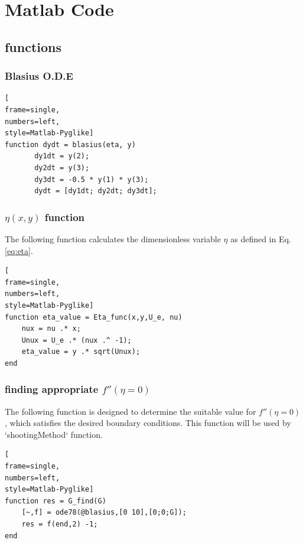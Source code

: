 \documentclass[]{report}
\begin{document}
\printnomenclature


\newpage
\appendix

\chapter{Matlab Code}

\section{functions}

\subsection{Blasius O.D.E}
\label{func:bla}
\begin{lstlisting}[
frame=single,
numbers=left,
style=Matlab-Pyglike]
function dydt = blasius(eta, y)
       dy1dt = y(2);
       dy2dt = y(3);
       dy3dt = -0.5 * y(1) * y(3);
       dydt = [dy1dt; dy2dt; dy3dt];
\end{lstlisting}

\subsection{$\eta(x,y)$ function}
\label{func:eta}

The following function calculates the dimensionless variable $\eta$ as defined in Eq. \ref{eq:eta}.

\begin{lstlisting}[
frame=single,
numbers=left,
style=Matlab-Pyglike]
function eta_value = Eta_func(x,y,U_e, nu)
    nux = nu .* x;
    Unux = U_e .* (nux .^ -1);
    eta_value = y .* sqrt(Unux);
end
\end{lstlisting}

\subsection{finding appropriate $f''(\eta=0)$}
\label{func:G_find}

The following function is designed to determine the suitable value for $f''(\eta=0)$, which satisfies the desired boundary conditions. This function will be used by `shootingMethod` function.
\begin{lstlisting}[
frame=single,
numbers=left,
style=Matlab-Pyglike]
function res = G_find(G)
    [~,f] = ode78(@blasius,[0 10],[0;0;G]);
    res = f(end,2) -1;
end
\end{lstlisting}
\end{document}
